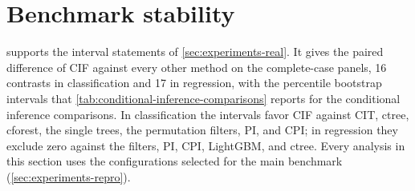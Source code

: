 \section{Benchmark stability}
\label{app:benchmark-stability}

 supports the interval statements of
\cref{sec:experiments-real}. It gives the paired difference of CIF against
every other method on the complete-case panels, 16 contrasts in classification
and 17 in regression, with the percentile bootstrap intervals that
\cref{tab:conditional-inference-comparisons} reports for the conditional
inference comparisons. In classification the intervals favor CIF against CIT,
ctree, cforest, the single trees, the permutation filters, PI, and CPI; in
regression they exclude zero against the filters, PI, CPI, LightGBM, and ctree.
Every analysis in this section uses the configurations selected for the main
benchmark (\cref{sec:experiments-repro}).

